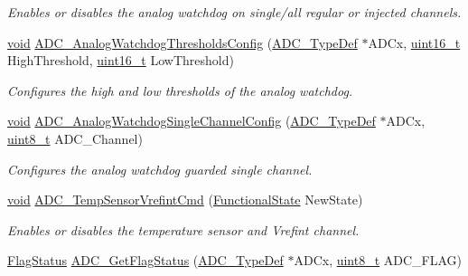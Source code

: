 \begin{DoxyCompactItemize}
\begin{DoxyCompactList}\small\item\em Enables or disables the analog watchdog on single/all regular or injected channels. \end{DoxyCompactList}\item 
\hyperlink{usb__devapi_8h_afabf60e7f57651d6d595a02c75f07cd0}{void} \hyperlink{group___a_d_c___private___functions_ga79588d02aa8e4147f21cb90a4708366d}{A\+D\+C\+\_\+\+Analog\+Watchdog\+Thresholds\+Config} (\hyperlink{struct_a_d_c___type_def}{A\+D\+C\+\_\+\+Type\+Def} $\ast$A\+D\+Cx, \hyperlink{_p_e___types_8h_a1f1825b69244eb3ad2c7165ddc99c956}{uint16\+\_\+t} High\+Threshold, \hyperlink{_p_e___types_8h_a1f1825b69244eb3ad2c7165ddc99c956}{uint16\+\_\+t} Low\+Threshold)
\begin{DoxyCompactList}\small\item\em Configures the high and low thresholds of the analog watchdog. \end{DoxyCompactList}\item 
\hyperlink{usb__devapi_8h_afabf60e7f57651d6d595a02c75f07cd0}{void} \hyperlink{group___a_d_c___private___functions_ga03cef3d12292ffa2b8520524d5b0226c}{A\+D\+C\+\_\+\+Analog\+Watchdog\+Single\+Channel\+Config} (\hyperlink{struct_a_d_c___type_def}{A\+D\+C\+\_\+\+Type\+Def} $\ast$A\+D\+Cx, \hyperlink{_p_e___types_8h_aba7bc1797add20fe3efdf37ced1182c5}{uint8\+\_\+t} A\+D\+C\+\_\+\+Channel)
\begin{DoxyCompactList}\small\item\em Configures the analog watchdog guarded single channel. \end{DoxyCompactList}\item 
\hyperlink{usb__devapi_8h_afabf60e7f57651d6d595a02c75f07cd0}{void} \hyperlink{group___a_d_c___private___functions_ga848682e2d7d3de9f8cf03ffa4c11f0b5}{A\+D\+C\+\_\+\+Temp\+Sensor\+Vrefint\+Cmd} (\hyperlink{agilefox_2library_2inc_2stm32f10x__type_8h_ac9a7e9a35d2513ec15c3b537aaa4fba1}{Functional\+State} New\+State)
\begin{DoxyCompactList}\small\item\em Enables or disables the temperature sensor and Vrefint channel. \end{DoxyCompactList}\item 
\hyperlink{agilefox_2library_2inc_2stm32f10x__type_8h_a89136caac2e14c55151f527ac02daaff}{Flag\+Status} \hyperlink{group___a_d_c___private___functions_gaa12546e51ec905c90a3aada432bd4633}{A\+D\+C\+\_\+\+Get\+Flag\+Status} (\hyperlink{struct_a_d_c___type_def}{A\+D\+C\+\_\+\+Type\+Def} $\ast$A\+D\+Cx, \hyperlink{_p_e___types_8h_aba7bc1797add20fe3efdf37ced1182c5}{uint8\+\_\+t} A\+D\+C\+\_\+\+F\+L\+AG)

\end{DoxyCompactItemize}
